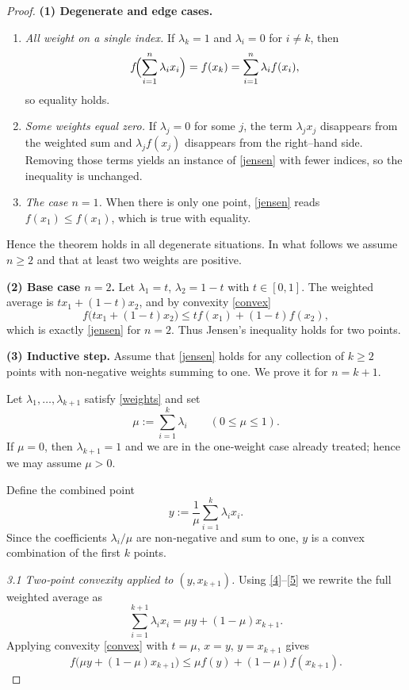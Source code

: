 \begin{proof}
\textbf{(1) Degenerate and edge cases.}
\begin{enumerate}
\item[(a)] \textit{All weight on a single index.}  
If $\lambda_k=1$ and $\lambda_i=0$ for $i\neq k$, then
\[
f\!\Bigl(\sum_{i=1}^{n}\lambda_i x_i\Bigr)=f(x_k)=\sum_{i=1}^{n}\lambda_i f(x_i),
\]
so equality holds.

\item[(b)] \textit{Some weights equal zero.}  
If $\lambda_j=0$ for some $j$, the term $\lambda_jx_j$ disappears from the weighted sum and $\lambda_jf(x_j)$ disappears from the right–hand side.  Removing those terms yields an instance of \eqref{jensen} with fewer indices, so the inequality is unchanged.

\item[(c)] \textit{The case $n=1$.}  
When there is only one point, \eqref{jensen} reads $f(x_1)\le f(x_1)$, which is true with equality.
\end{enumerate}
Hence the theorem holds in all degenerate situations.  In what follows we assume $n\ge2$ and that at least two weights are positive.

\medskip

\textbf{(2) Base case $n=2$.}  
Let $\lambda_1=t$, $\lambda_2=1-t$ with $t\in[0,1]$.  The weighted average is $tx_1+(1-t)x_2$, and by convexity \eqref{convex}
\[
f\bigl(tx_1+(1-t)x_2\bigr)\le t f(x_1)+(1-t)f(x_2),
\]
which is exactly \eqref{jensen} for $n=2$.  Thus Jensen’s inequality holds for two points.

\medskip

\textbf{(3) Inductive step.}  
Assume that \eqref{jensen} holds for any collection of $k\ge2$ points with non‑negative weights summing to one.  We prove it for $n=k+1$.

Let $\lambda_1,\dots,\lambda_{k+1}$ satisfy \eqref{weights} and set
\[
\mu:=\sum_{i=1}^{k}\lambda_i\qquad(0\le\mu\le1).
\tag{4}
\]
If $\mu=0$, then $\lambda_{k+1}=1$ and we are in the one‑weight case already treated; hence we may assume $\mu>0$.

Define the combined point
\[
y:=\frac{1}{\mu}\sum_{i=1}^{k}\lambda_i x_i .
\tag{5}
\]
Since the coefficients $\lambda_i/\mu$ are non‑negative and sum to one, $y$ is a convex combination of the first $k$ points.

\medskip

\textit{3.1 Two‑point convexity applied to $(y,x_{k+1})$.}  
Using \eqref{4}–\eqref{5} we rewrite the full weighted average as
\[
\sum_{i=1}^{k+1}\lambda_i x_i
= \mu y + (1-\mu)x_{k+1}.
\tag{6}
\]
Applying convexity \eqref{convex} with $t=\mu$, $x=y$, $y=x_{k+1}$ gives
\[
f\!\bigl(\mu y+(1-\mu)x_{k+1}\bigr)\le \mu f(y)+(1-\mu)f(x_{k+1}).
\tag{7}
\]


\end{proof}
